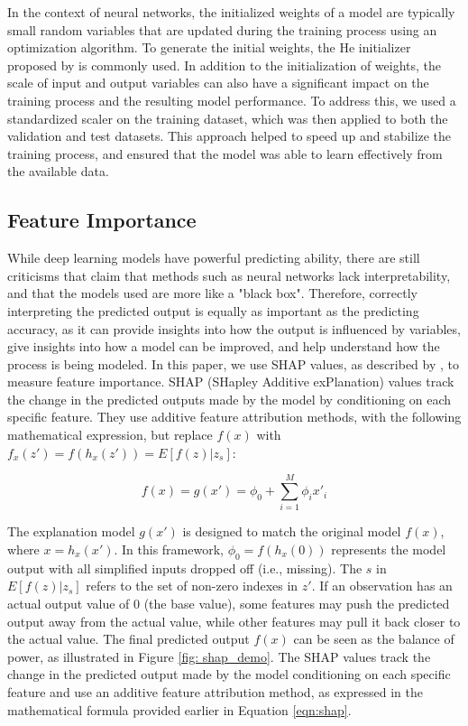 In the context of neural networks, the initialized weights of a model are typically small random variables that are updated during the training process using an optimization algorithm. To generate the initial weights, the He initializer proposed by \citet*{he2015delving} is commonly used. In addition to the initialization of weights, the scale of input and output variables can also have a significant impact on the training process and the resulting model performance. To address this, we used a standardized scaler on the training dataset, which was then applied to both the validation and test datasets. This approach helped to speed up and stabilize the training process, and ensured that the model was able to learn effectively from the available data.

\subsection{Feature Importance}
\label{subsec:feature importance}

While deep learning models have powerful predicting ability, there are still criticisms that claim that methods such as neural networks lack interpretability, and that the models used are more like a "black box". Therefore, correctly interpreting the predicted output is equally as important as the predicting accuracy, as it can provide insights into how the output is influenced by variables, give insights into how a model can be improved, and help understand how the process is being modeled. In this paper, we use SHAP values, as described by \citet*{NIPS2017_8a20a862}, to measure feature importance. SHAP (SHapley Additive exPlanation) values track the change in the predicted outputs made by the model by conditioning on each specific feature. They use additive feature attribution methods, with the following mathematical expression, but replace $f(x)$ with $f_x(z')=f(h_x(z'))=E[f(z)|z_s]$:

\begin{equation}
  \label{eqn:shap}
  f(x)=g(x')=\phi_0+\sum^M_{i=1}\phi_i x'_i
  \end{equation}

The explanation model $g(x')$ is designed to match the original model $f(x)$, where $x = h_x(x')$. In this framework, $\phi_0 = f(h_x(0))$ represents the model output with all simplified inputs dropped off (i.e., missing). The $s$ in $E[f(z)|z_s]$ refers to the set of non-zero indexes in $z'$. If an observation has an actual output value of 0 (the base value), some features may push the predicted output away from the actual value, while other features may pull it back closer to the actual value. The final predicted output $f(x)$ can be seen as the balance of power, as illustrated in Figure \ref{fig: shap_demo}. The SHAP values track the change in the predicted output made by the model conditioning on each specific feature and use an additive feature attribution method, as expressed in the mathematical formula provided earlier in Equation \ref{eqn:shap}.

